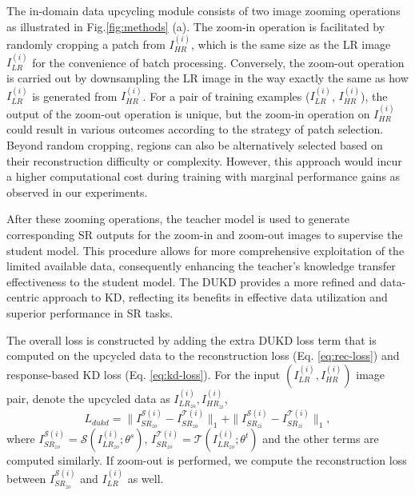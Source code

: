 \documentclass[10pt,twocolumn,letterpaper]{article}
\begin{document}
The in-domain data upcycling module consists of two image zooming operations as illustrated in Fig.\ref{fig:methods} (a). The zoom-in operation is facilitated by randomly cropping a patch from $I_{HR}^{(i)}$, which is the same size as the LR image $I_{LR}^{(i)}$ for the convenience of batch processing. Conversely, the zoom-out operation is carried out by downsampling the LR image in the way exactly the same as how $I_{LR}^{(i)}$ is generated from $I_{HR}^{(i)}$. For a pair of training examples ($I_{LR}^{(i)}$, $I_{HR}^{(i)}$), the output of the zoom-out operation is unique, but the zoom-in operation on $I_{HR}^{(i)}$ could result in various outcomes according to the strategy of patch selection. Beyond random cropping, regions can also be alternatively selected based on their reconstruction difficulty or complexity. However, this approach would incur a higher computational cost during training with marginal performance gains as observed in our experiments.

After these zooming operations, the teacher model is used to generate corresponding SR outputs for the zoom-in and zoom-out images to supervise the student model.
This procedure allows for more comprehensive exploitation of the limited available data, consequently enhancing the teacher's knowledge transfer effectiveness to the student model. The DUKD provides a more refined and data-centric approach to KD, reflecting its benefits in effective data utilization and superior performance in SR tasks.

The overall loss is constructed by adding the extra DUKD loss term that is computed on the upcycled data to the reconstruction loss (Eq. \ref{eq:rec-loss}) and response-based KD loss (Eq. \ref{eq:kd-loss}). For the input $(I_{LR}^{(i)}, I_{HR}^{(i)})$ image pair, denote the upcycled data as $I_{LR_{zo}}^{(i)}, I_{HR_{zi}}^{(i)}$,
\begin{equation}\label{key}L_{dukd} = \|I_{SR_{zo}}^{\mathcal{S}(i)} - I_{SR_{zo}}^{\mathcal{T}(i)}\|_1 + \|I_{SR_{zi}}^{\mathcal{S}(i)} - I_{SR_{zi}}^{\mathcal{T}(i)}\|_1,
\end{equation}
where $I_{SR_{zo}}^{\mathcal{S}(i)} = \mathcal{S}(I_{LR_{zo}}^{(i)};\theta^{s})$, $I_{SR_{zo}}^{\mathcal{T}(i)} = \mathcal{T}(I_{LR_{zo}}^{(i)};\theta^{t})$ and the other terms are computed similarly. If zoom-out is performed, we compute the reconstruction loss between $I_{SR_{zo}}^{\mathcal{S}(i)}$ and $I_{LR}^{(i)}$ as well.
\end{document}
